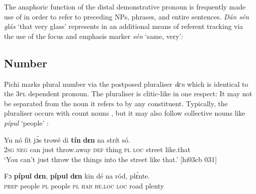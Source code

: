 The anaphoric function of the distal demonstrative pronoun is frequently made use of in order to refer to preceding NPs, phrases, and entire sentences. \textit{Dán sén glás} ‘that very glass’ represents in  an additional means of referent tracking via the use of the focus and emphasis marker \textit{sén} ‘same, very’: 



\ea%
    \label{ex:key:206}
\z
\z

\subsection{Number}

Pichi marks plural number via the postposed pluraliser \textit{dɛn} which is identical to the \textsc{3pl} dependent pronoun. The pluraliser is clitic-like in one respect: It may not be separated from the noun it refers to by any constituent. Typically, the pluraliser occurs with count nouns , but it may also follow collective nouns like \textit{pípul} ‘people’ : 


\ea%
    \label{ex:key:207}
    \gll Yu  nó  fít  jɔ́s  trowé    di  \textbf{tín}  \textbf{dɛn}  na  strít    só.\\
\textsc{2sg}  \textsc{neg}  can  just  throw.away  \textsc{def}  thing  \textsc{pl}  \textsc{loc}  street  like.that\\

\glt ‘You can’t just throw the things into the street like that.’ [hi03cb 031]
\z


\ea%
    \label{ex:key:208}
    \gll Fɔ  \textbf{pípul}  \textbf{dɛn},    \textbf{pípul}  \textbf{dɛn}  kin  dé    na  ród,    plɛ́nte.\\
\textsc{prep}  people  \textsc{pl}    people  \textsc{pl}  \textsc{hab}  \textsc{be.loc}  \textsc{loc}  road    plenty\\

